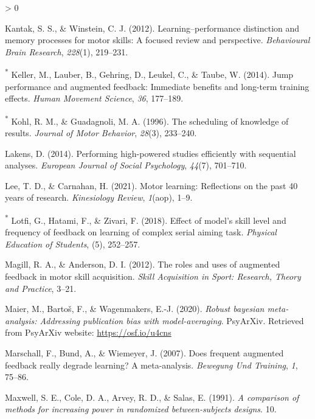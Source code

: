 \documentclass[
  english,
  man, donotrepeattitle,floatsintext]{apa7}
\newlength{\cslhangindent}
\newenvironment{CSLReferences}[2] %
 {%
  \setlength{\parindent}{0pt}
  \ifodd #1 \everypar{\setlength{\hangindent}{\cslhangindent}}\ignorespaces\fi
  \ifnum #2 > 0
  \setlength{\parskip}{#2\baselineskip}
  \fi
 }%
 {}
\begin{document}
\begin{CSLReferences}{1}{0}
\leavevmode\hypertarget{ref-Kantak2012}{}%
Kantak, S. S., \& Winstein, C. J. (2012). Learning--performance distinction and memory processes for motor skills: A focused review and perspective. \emph{Behavioural Brain Research}, \emph{228}(1), 219--231.

\leavevmode\hypertarget{ref-Keller2014}{}%
\textsuperscript{*} Keller, M., Lauber, B., Gehring, D., Leukel, C., \& Taube, W. (2014). Jump performance and augmented feedback: Immediate benefits and long-term training effects. \emph{Human Movement Science}, \emph{36}, 177--189.

\leavevmode\hypertarget{ref-Kohl1996}{}%
\textsuperscript{*} Kohl, R. M., \& Guadagnoli, M. A. (1996). The scheduling of knowledge of results. \emph{Journal of Motor Behavior}, \emph{28}(3), 233--240.

\leavevmode\hypertarget{ref-Lakens2014}{}%
Lakens, D. (2014). Performing high-powered studies efficiently with sequential analyses. \emph{European Journal of Social Psychology}, \emph{44}(7), 701--710.

\leavevmode\hypertarget{ref-Lee2021}{}%
Lee, T. D., \& Carnahan, H. (2021). Motor learning: Reflections on the past 40 years of research. \emph{Kinesiology Review}, \emph{1}(aop), 1--9.

\leavevmode\hypertarget{ref-Lotfi2018}{}%
\textsuperscript{*} Lotfi, G., Hatami, F., \& Zivari, F. (2018). Effect of model's skill level and frequency of feedback on learning of complex serial aiming task. \emph{Physical Education of Students}, (5), 252--257.

\leavevmode\hypertarget{ref-Magill2012}{}%
Magill, R. A., \& Anderson, D. I. (2012). The roles and uses of augmented feedback in motor skill acquisition. \emph{Skill Acquisition in Sport: Research, Theory and Practice}, 3--21.

\leavevmode\hypertarget{ref-Maier2020}{}%
Maier, M., Bartoš, F., \& Wagenmakers, E.-J. (2020). \emph{Robust bayesian meta-analysis: Addressing publication bias with model-averaging}. PsyArXiv. Retrieved from PsyArXiv website: \url{https://osf.io/u4cns}

\leavevmode\hypertarget{ref-Marschall2007}{}%
Marschall, F., Bund, A., \& Wiemeyer, J. (2007). Does frequent augmented feedback really degrade learning? A meta-analysis. \emph{Bewegung Und Training}, \emph{1}, 75--86.

\leavevmode\hypertarget{ref-Maxwell1991}{}%
Maxwell, S. E., Cole, D. A., Arvey, R. D., \& Salas, E. (1991). \emph{A comparison of methods for increasing power in randomized between-subjects designs}. 10.


\end{CSLReferences}
\end{document}
